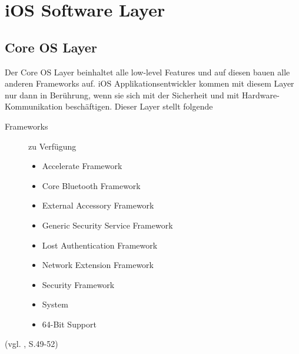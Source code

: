 
\section{iOS Software Layer}
\label{sec:iOSSWLayer}

\subsection{Core OS Layer}
\label{sec:CoreLayer}

Der Core OS Layer beinhaltet alle \glqq low-level\grqq{} Features und auf
diesen bauen alle anderen Frameworks auf. iOS Applikationsentwickler kommen mit
diesem Layer nur dann in Berührung, wenn sie sich mit der Sicherheit und mit
Hardware-Kommunikation beschäftigen. Dieser Layer stellt folgende
\begin{description}
	\item[\glqq Frameworks\grqq{}]zu Verfügung~\par
	\begin{itemize}
		\item Accelerate Framework
		\item Core Bluetooth Framework
		\item External Accessory Framework
		\item Generic Security Service Framework
		\item Lost Authentication Framework
		\item Network Extension Framework
		\item Security Framework
		\item System
		\item 64-Bit Support
	\end{itemize}
\end{description}
 (vgl. \cite{Apple[6]}, S.49-52)
